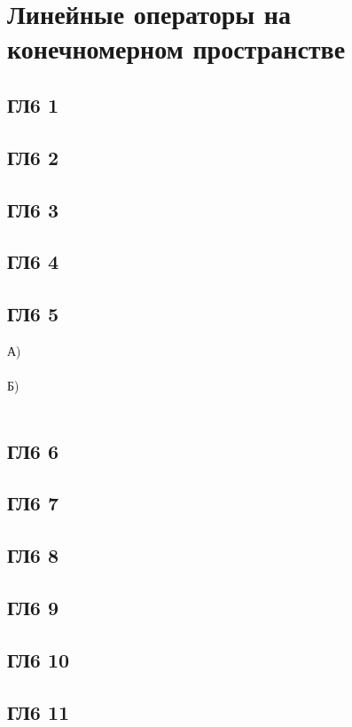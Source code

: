 \newpage		
	\section{Линейные операторы на конечномерном пространстве}
		
		\subsection{ГЛ6 1}
		
		\subsection{ГЛ6 2}
		
		\subsection{ГЛ6 3}
		
		\subsection{ГЛ6 4}
		
		\subsection{ГЛ6 5}
		А)\\
		\\
		Б)\\
		\\
		
		\subsection{ГЛ6 6}
		
		\subsection{ГЛ6 7}
		
		\subsection{ГЛ6 8}
		
		\subsection{ГЛ6 9}
		
		\subsection{ГЛ6 10}
		
		\subsection{ГЛ6 11}